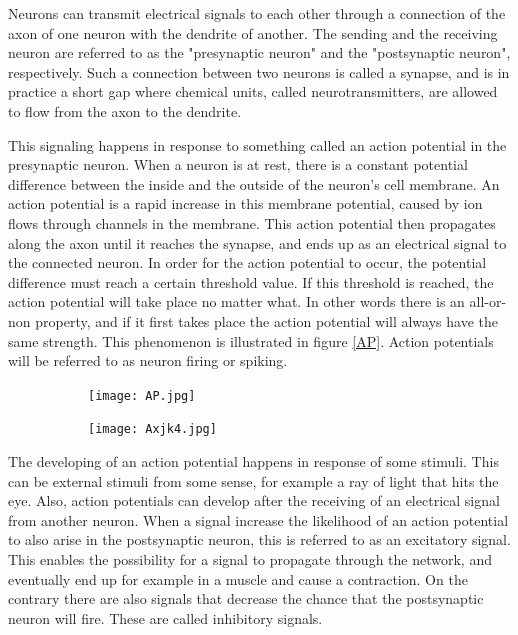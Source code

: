 Neurons can transmit electrical signals to each other through a connection of the axon of one neuron with the dendrite of another. The sending and the receiving neuron are referred to as the "presynaptic neuron" and the "postsynaptic neuron", respectively. Such a connection between two neurons is called a synapse, and is in practice a short gap where chemical units, called neurotransmitters, are allowed to flow from the axon to the dendrite. 

This signaling happens in response to something called an action potential in the presynaptic neuron. When a neuron is at rest, there is a constant potential difference between the inside and the outside of the neuron's cell membrane. An action potential is a rapid increase in this membrane potential, caused by ion flows through channels in the membrane. This action potential then propagates along the axon until it reaches the synapse, and ends up as an electrical signal to the connected neuron. In order for the action potential to occur, the potential difference must reach a certain threshold value. If this threshold is reached, the action potential will take place no matter what. In other words there is an all-or-non property, and if it first takes place the action potential will always have the same strength. This phenomenon is illustrated in figure \ref{AP}. Action potentials will be referred to as neuron firing or spiking.

\begin{figure}[h]
\caption{}
\label{AP}
\begin{subfigure}
\centering
\texttt{[image: AP.jpg]}
\end{subfigure}
\begin{subfigure}
\centering
\texttt{[image: Axjk4.jpg]}
\end{subfigure}
\end{figure} 

The developing of an action potential happens in response of some stimuli. This can be external stimuli from some sense, for example a ray of light that hits the eye. Also, action potentials can develop after the receiving of an electrical signal from another neuron. When a signal increase the likelihood of an action potential to also arise in the postsynaptic neuron, this is referred to as an excitatory signal. This enables the possibility for a signal to propagate through the network, and eventually end up for example in a muscle and cause a contraction. On the contrary there are also signals that decrease the chance that the postsynaptic neuron will fire. These are called inhibitory signals.

